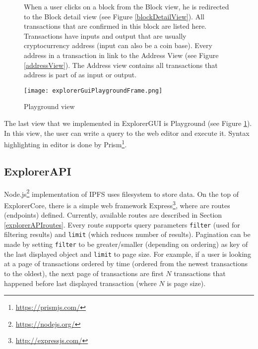 \begin{figure}[h]
When a user clicks on a block from the Block view, he is redirected to the Block detail view (see Figure \ref{blockDetailView}). All transactions that are confirmed in this block are listed here. Transactions have inputs and output that are usually cryptocurrency address (input can also be a coin base). Every address in a transaction in link to the Address View (see Figure \ref{addressView}). The Address view contains all transactions that address is part of as input or output.

\centering
\texttt{[image: explorerGuiPlaygroundFrame.png]}
\caption{Playground view}
\label{playgroundView}
\end{figure}

The last view that we implemented in ExplorerGUI is Playground (see Figure \ref{playgroundView}). In this view, the user can write a query to the web editor and execute it. Syntax highlighting in editor is done by Prism\footnote{\url{https://prismjs.com/}}.


\subsection{ExplorerAPI}
Node.js\footnote{\url{https://nodejs.org/}} implementation of IPFS uses filesystem to store data. On the top of ExplorerCore, there is a simple web framework Express\footnote{\url{http://expressjs.com/}}, where are routes (endpoints) defined. Currently, available routes are described in Section \ref{explorerAPIroutes}. Every route supports query parameters \texttt{filter} (used for filtering results) and \texttt{limit} (which reduces number of results). Pagination can be made by setting \texttt{filter} to be greater/smaller (depending on ordering) as key of the last displayed object and \texttt{limit} to page size. For example, if a user is looking at a page of transactions ordered by time (ordered from the newest transactions to the oldest), the next page of transactions are first \(N\) transactions that happened before last displayed transaction (where \(N\) is page size).
